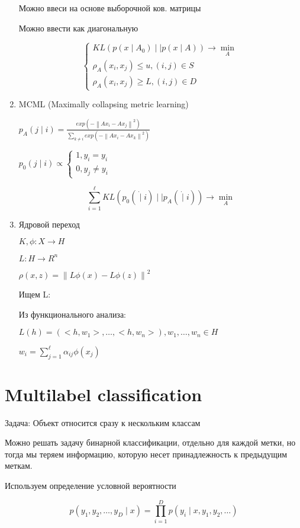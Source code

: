 \documentclass[a4paper, 12pt]{article}
\newcommand\norm[1]{\left\lVert#1\right\rVert}
\begin{document}
\begin{enumerate}
    Можно ввеси на основе выборочной ков. матрицы

    Можно ввести как диагональную

    \[\begin{cases}
        KL(p(x \mid A_0) \mid\mid p(x \mid A)) \rightarrow \min_{A} \\
        \rho_A(x_i, x_j) \leq u, (i, j) \in S \\
        \rho_A(x_i, x_j) \geq L, (i, j) \in D
    \end{cases}\]

    \item MCML (Maximally collapsing metric learning)
    
    $p_A(j \mid i) = \frac{exp(- \norm{Ax_i - Ax_j}^2)}
    {\sum_{k \neq i}exp(- \norm{Ax_i - Ax_k}^2)}$

    $p_0(j \mid i) \propto
    \begin{cases}
        1, y_i = y_i \\
        0, y_j \neq y_i
    \end{cases}$

    \[\sum_{i = 1}^{\ell} KL(p_0(\dot \mid i) 
    \mid \mid p_A(\dot \mid i)) \rightarrow \min_A\]

    \item Ядровой переход
    
    $K, \phi: X \to H$

    $L: H \to R^n$

    $\rho(x, z) = \norm{L\phi(x) - L\phi(z)}^2$

    Ищем L:

    Из функционального анализа:

    \(L(h) = (<h, w_1>, \ldots, <h, w_n>), w_1, \ldots, w_n \in H\)

    \(w_i = \sum_{j = 1}^{\ell} \alpha_{ij}\phi(x_j)\)
\end{enumerate}

\section{Multilabel classification}

Задача: Объект относится сразу к нескольким классам

Можно решать задачу бинарной классификации, 
отдельно для каждой метки, но тогда
мы теряем информацию, которую несет
принадлежность к предыдущим меткам.

Используем определение условной вероятности

\[p(y_1, y_2, \dots, y_D \mid x) = \prod_{i = 1}^D p(y_i \mid x, y_1, y_2, \dots)\]
\end{document}

